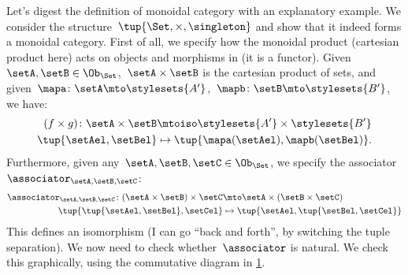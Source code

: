 
\begin{example}
  Let's digest the definition of monoidal category with an explanatory example.
  We consider the structure~$\tup{\Set,\times,\singleton}$ and show that it indeed forms a monoidal category.
  First of all, we specify how the monoidal product (cartesian product here) acts on objects and morphisms in \Set (it is a functor).
  Given~$\setA,\setB\in \Ob_{\Set}$,~$\setA\times \setB$ is the cartesian product of sets, and given~$\mapa\colon \setA\mto \stylesets{A'}$,~$\mapb\colon \setB\mto \stylesets{B'}$, we have:
  \begin{equation*}
      \label{eq:set_mon_prod_2}
    \begin{aligned}
    (f\times g)
      \colon \setA\times \setB&\mtoiso \stylesets{A'}\times \stylesets{B'}\\
      \tup{\setAel,\setBel}&\mapsto \tup{\mapa(\setAel),\mapb(\setBel)}.
    \end{aligned}
  \end{equation*}
  Furthermore, given any~$\setA,\setB,\setC\in \Ob_{\Set}$, we specify the associator~$\associator_{\setA,\setB,\setC}$:
  \begin{equation*}
      \label{eq:set_mon_prod_3}
    \begin{aligned}
      \associator_{\setA,\setB,\setC}\colon (\setA\times \setB)\times \setC&\mto \setA\times (\setB\times \setC)\\
      \tup{\tup{\setAel,\setBel},\setCel}&\mapsto \tup{\setAel,\tup{\setBel,\setCel}}
    \end{aligned}
  \end{equation*}
  This defines an isomorphism (I can go ``back and forth'', by switching the tuple separation).
  We now need to check whether~$\associator$ is natural.
  We check this graphically, using the commutative diagram in \cref{fig:monoidal_set_ass_nat}.

  \begin{figure}[h!]
    \begin{center}
    \end{center}
    \caption{\label{fig:monoidal_set_ass_nat}}
  \end{figure}


\end{example}

